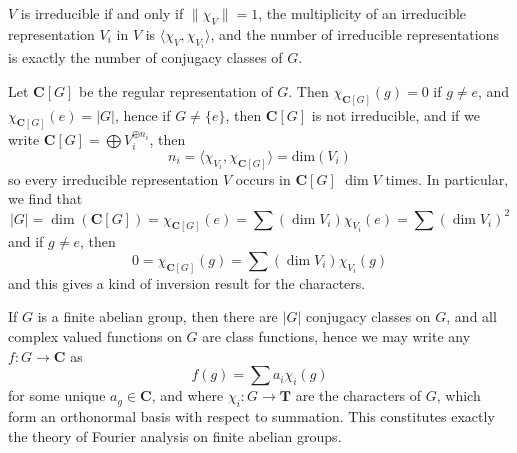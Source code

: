 \begin{corollary}
    $V$ is irreducible if and only if $\| \chi_V \| = 1$, the multiplicity of an irreducible representation $V_i$ in $V$ is $\langle \chi_V, \chi_{V_i} \rangle$, and the number of irreducible representations is exactly the number of conjugacy classes of $G$.
\end{corollary}

\begin{example}
    Let $\mathbf{C}[G]$ be the regular representation of $G$. Then $\chi_{\mathbf{C}[G]}(g) = 0$ if $g \neq e$, and $\chi_{\mathbf{C}[G]}(e) = |G|$, hence if $G \neq \{ e \}$, then $\mathbf{C}[G]$ is not irreducible, and if we write $\mathbf{C}[G] = \bigoplus V_i^{\oplus n_i}$, then
    \[ n_i = \langle \chi_{V_i}, \chi_{\mathbf{C}[G]} \rangle = \text{dim}(V_i) \]
    so every irreducible representation $V$ occurs in $\mathbf{C}[G]$ $\dim V$ times. In particular, we find that
    \[ |G| = \dim(\mathbf{C}[G]) = \chi_{\mathbf{C}[G]}(e) = \sum (\dim V_i) \chi_{V_i}(e) = \sum (\dim V_i)^2 \]
    and if $g \neq e$, then
    \[ 0 = \chi_{\mathbf{C}[G]}(g) = \sum (\dim V_i) \chi_{V_i}(g) \]
    and this gives a kind of inversion result for the characters.
\end{example}

\begin{example}
    If $G$ is a finite abelian group, then there are $|G|$ conjugacy classes on $G$, and all complex valued functions on $G$ are class functions, hence we may write any $f: G \to \mathbf{C}$ as
    \[ f(g) = \sum a_i \chi_i(g) \]
    for some unique $a_g \in \mathbf{C}$, and where $\chi_i: G \to \mathbf{T}$ are the characters of $G$, which form an orthonormal basis with respect to summation. This constitutes exactly the theory of Fourier analysis on finite abelian groups.
\end{example}


